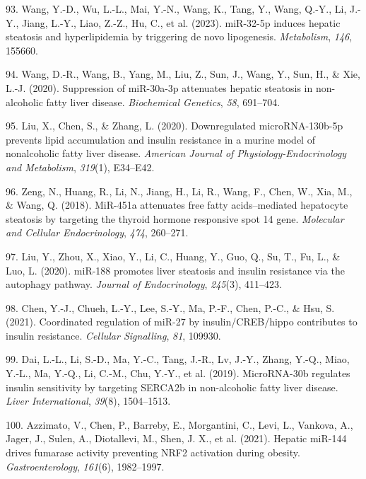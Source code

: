 \documentclass[
  11pt,
  letterpaper,
]{book}
\newlength{\cslhangindent}
\newenvironment{CSLReferences}[2] %
 {\begin{list}{}{%
  \setlength{\itemindent}{0pt}
  \setlength{\leftmargin}{0pt}
  \setlength{\parsep}{0pt}
  \ifodd #1
   \setlength{\leftmargin}{\cslhangindent}
   \setlength{\itemindent}{-1\cslhangindent}
  \fi
  \setlength{\itemsep}{#2\baselineskip}}}
 {\end{list}}
\begin{document}
\begin{CSLReferences}{1}{0}
93. Wang, Y.-D., Wu, L.-L., Mai, Y.-N., Wang, K., Tang, Y., Wang, Q.-Y.,
Li, J.-Y., Jiang, L.-Y., Liao, Z.-Z., Hu, C., et al. (2023). miR-32-5p
induces hepatic steatosis and hyperlipidemia by triggering de novo
lipogenesis. \emph{Metabolism}, \emph{146}, 155660.

94. Wang, D.-R., Wang, B., Yang, M., Liu, Z., Sun, J., Wang, Y., Sun,
H., \& Xie, L.-J. (2020). Suppression of miR-30a-3p attenuates hepatic
steatosis in non-alcoholic fatty liver disease. \emph{Biochemical
Genetics}, \emph{58}, 691--704.

95. Liu, X., Chen, S., \& Zhang, L. (2020). Downregulated
microRNA-130b-5p prevents lipid accumulation and insulin resistance in a
murine model of nonalcoholic fatty liver disease. \emph{American Journal
of Physiology-Endocrinology and Metabolism}, \emph{319}(1), E34--E42.

96. Zeng, N., Huang, R., Li, N., Jiang, H., Li, R., Wang, F., Chen, W.,
Xia, M., \& Wang, Q. (2018). MiR-451a attenuates free fatty
acids--mediated hepatocyte steatosis by targeting the thyroid hormone
responsive spot 14 gene. \emph{Molecular and Cellular Endocrinology},
\emph{474}, 260--271.

97. Liu, Y., Zhou, X., Xiao, Y., Li, C., Huang, Y., Guo, Q., Su, T., Fu,
L., \& Luo, L. (2020). miR-188 promotes liver steatosis and insulin
resistance via the autophagy pathway. \emph{Journal of Endocrinology},
\emph{245}(3), 411--423.

98. Chen, Y.-J., Chueh, L.-Y., Lee, S.-Y., Ma, P.-F., Chen, P.-C., \&
Hsu, S. (2021). Coordinated regulation of miR-27 by insulin/CREB/hippo
contributes to insulin resistance. \emph{Cellular Signalling},
\emph{81}, 109930.

99. Dai, L.-L., Li, S.-D., Ma, Y.-C., Tang, J.-R., Lv, J.-Y., Zhang,
Y.-Q., Miao, Y.-L., Ma, Y.-Q., Li, C.-M., Chu, Y.-Y., et al. (2019).
MicroRNA-30b regulates insulin sensitivity by targeting SERCA2b in
non-alcoholic fatty liver disease. \emph{Liver International},
\emph{39}(8), 1504--1513.

100. Azzimato, V., Chen, P., Barreby, E., Morgantini, C., Levi, L.,
Vankova, A., Jager, J., Sulen, A., Diotallevi, M., Shen, J. X., et al.
(2021). Hepatic miR-144 drives fumarase activity preventing NRF2
activation during obesity. \emph{Gastroenterology}, \emph{161}(6),
1982--1997.


\end{CSLReferences}
\end{document}
